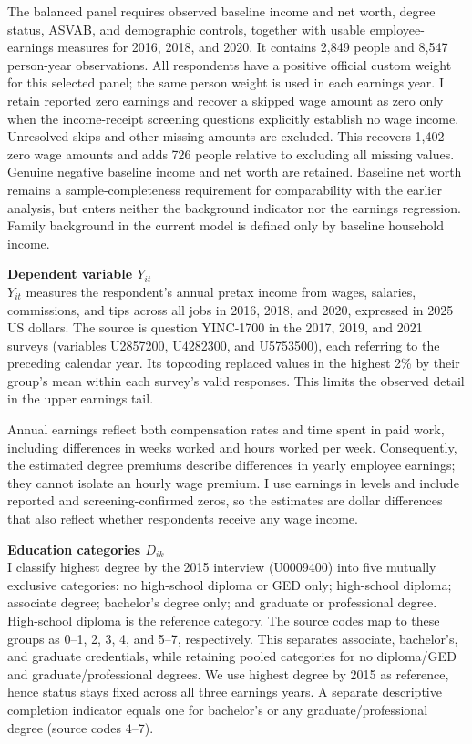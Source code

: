 \documentclass[12pt,letterpaper]{article}
\begin{document}
The balanced panel requires observed baseline income and net worth, degree status,
ASVAB, and demographic controls, together with usable employee-earnings measures
for 2016, 2018, and 2020. It contains 2,849 people and 8,547 person-year observations.
All respondents have a positive official custom weight for this selected panel;
the same person weight is used in each earnings year. I retain reported zero earnings and
recover a skipped wage amount as zero only when the income-receipt screening
questions explicitly establish no wage income. Unresolved skips and other missing
amounts are excluded. This recovers 1,402 zero wage amounts and adds 726 people
relative to excluding all missing values. Genuine negative baseline income and net worth
are retained. Baseline net worth remains a sample-completeness requirement for
comparability with the earlier analysis, but enters neither the background indicator
nor the earnings regression. Family background in the current model is defined
only by baseline household income.\newline

\textbf{Dependent variable $Y_{it}$}\\
$Y_{it}$ measures the respondent's annual pretax income from wages, salaries,
commissions, and tips across all jobs in 2016, 2018, and 2020, expressed in 2025
US dollars. The source is question YINC-1700 in the 2017, 2019, and 2021 surveys
(variables U2857200, U4282300, and U5753500), each referring to the preceding
calendar year. Its topcoding replaced values in the highest 2\% by 
their group's mean within each survey's valid responses. This limits the
 observed detail in the upper earnings tail.\newline

Annual earnings reflect both compensation rates and time spent in paid work,
including differences in weeks worked and hours worked per week. Consequently,
the estimated degree premiums describe differences in yearly employee earnings;
they cannot isolate an hourly wage premium. I use earnings in levels and include
reported and screening-confirmed zeros, so the estimates are dollar differences
that also reflect whether respondents receive any wage income.\newline

\textbf{Education categories $D_{ik}$}\\
I classify highest degree by the 2015 interview (U0009400) into five mutually exclusive
categories: no high-school diploma or GED only; high-school diploma; associate
degree; bachelor's degree only; and graduate or professional degree. High-school
diploma is the reference category. The source codes map to these groups as
0--1, 2, 3, 4, and 5--7, respectively. This separates associate, bachelor's, and
graduate credentials, while retaining pooled categories for no diploma/GED and
graduate/professional degrees. We use highest degree by 2015 as reference, hence status 
stays fixed across all three earnings years. A separate descriptive completion indicator
equals one for bachelor's or any graduate/professional degree (source codes 4--7).\newline
\end{document}
